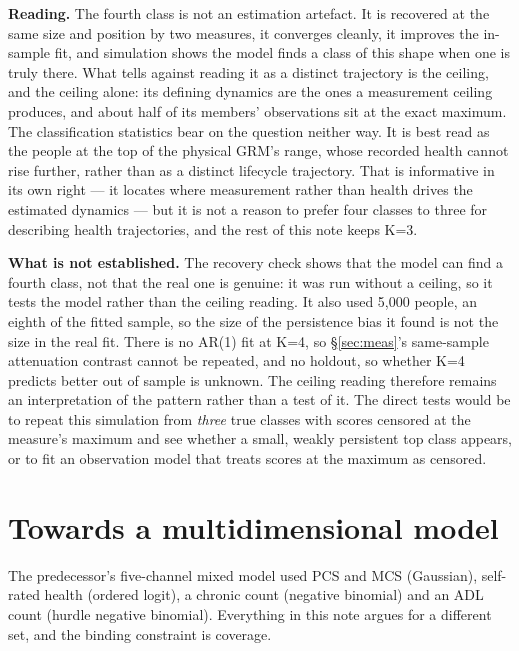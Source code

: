 \documentclass[11pt]{article}
\begin{document}
\textbf{Reading.} The fourth class is not an estimation artefact. It is
recovered at the same size and position by two measures, it converges
cleanly, it improves the in-sample fit, and simulation shows the model finds
a class of this shape when one is truly there. What tells against reading it
as a distinct trajectory is the ceiling, and the ceiling alone: its defining
dynamics are the ones a measurement ceiling produces, and about half of its
members' observations sit at the exact maximum. The classification statistics
bear on the question neither way. It is best read as the people at the top of
the physical GRM's range, whose recorded health cannot rise further, rather
than as a distinct lifecycle trajectory. That is informative
in its own right --- it locates where measurement rather than health drives
the estimated dynamics --- but it is not a reason to prefer four classes to
three for describing health trajectories, and the rest of this note keeps
K=3.

\textbf{What is not established.} The recovery check shows that the model
can find a fourth class, not that the real one is genuine: it was run without
a ceiling, so it tests the model rather than the ceiling reading. It also used
5{,}000 people, an eighth of the fitted sample, so the size of the persistence
bias it found is not the size in the real fit. There is no AR(1) fit at K=4,
so \S\ref{sec:meas}'s same-sample attenuation contrast cannot be repeated, and
no holdout, so whether K=4 predicts better out of sample is unknown. The
ceiling reading therefore remains an interpretation of the pattern rather than
a test of it. The direct tests would be to repeat this simulation from
\emph{three} true classes with scores censored at the measure's maximum and
see whether a small, weakly persistent top class appears, or to fit an
observation model that treats scores at the maximum as censored.

\section{Towards a multidimensional model}
\label{sec:multidim}

The predecessor's five-channel mixed model used PCS and MCS (Gaussian),
self-rated health (ordered logit), a chronic count (negative binomial) and an
ADL count (hurdle negative binomial). Everything in this note argues for a
different set, and the binding constraint is coverage.
\end{document}
